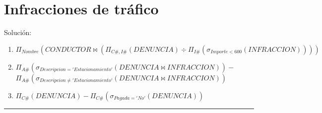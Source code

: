 \documentclass[a4paper]{article}
\begin{document}
\section{Infracciones de tráfico}

Solución:

\begin{enumerate}
    \item $\Pi_{Nombre} \left( CONDUCTOR \bowtie \left( \Pi_{C\#,I\#} \left( DENUNCIA \right) \div \Pi_{I\#} \left( \sigma_{Importe<600} \left( INFRACCION \right) \right) \right) \right)$
    \item $\Pi_{A\#} (\sigma_{Descripcion='Estacionamiento'} (DENUNCIA \bowtie INFRACCION)) -$ \\
    $\Pi_{A\#} (\sigma_{Descripcion \neq 'Estacionamiento'} (DENUNCIA \bowtie INFRACCION))$
    \item $\Pi_{C\#} \left( DENUNCIA \right) - \Pi_{C\#} \left( \sigma_{Pagada='No'} \left( DENUNCIA \right) \right)$
\end{enumerate}

\vspace{1em}
\hrule
\doclicenseThis
\end{document}
